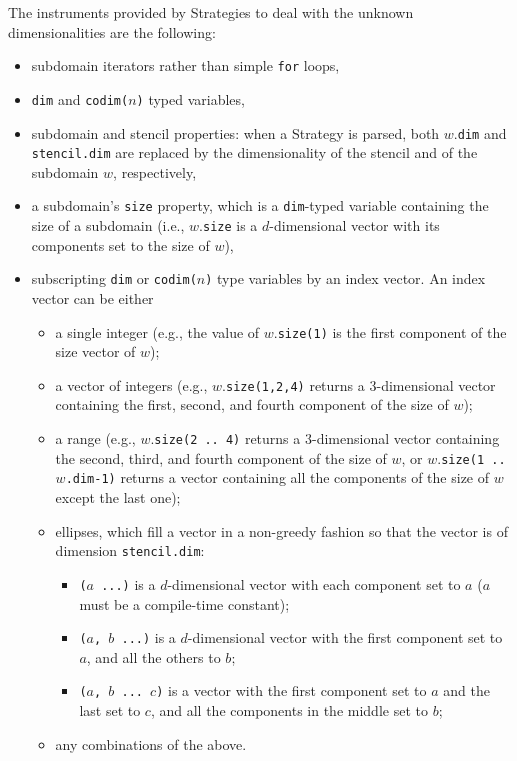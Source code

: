 The instruments provided by Strategies to deal with the unknown dimensionalities are the following:
\begin{itemize}
	\item subdomain iterators rather than simple \texttt{for} loops,
	\item \texttt{dim} and \texttt{codim($n$)} typed variables,
	\item subdomain and stencil properties: when a Strategy is parsed, both $w$.\texttt{dim} and \texttt{stencil.dim}
		are replaced by the dimensionality of the stencil and of the subdomain $w$, respectively,
	\item a subdomain's \texttt{size} property, which is a \texttt{dim}-typed variable containing the size of a subdomain
		(i.e., $w$.\texttt{size} is a $d$-dimensional vector with its components set to the size of $w$),
	\item subscripting \texttt{dim} or \texttt{codim($n$)} type variables by an index vector.
		An index vector can be either
		\begin{itemize}
			\item a single integer
				(e.g., the value of $w$.\texttt{size(1)} is the first component of the size vector of $w$);
			\item a vector of integers
				(e.g., $w$.\texttt{size(1,2,4)} returns a $3$-dimensional vector containing the first, second, and fourth
				component of the size of $w$);
			\item a range
				(e.g., $w$.\texttt{size(2 .. 4)} returns a $3$-dimensional vector containing the second, third, and fourth
				component of the size of $w$, or $w$.\texttt{size(1 .. $w$.dim-1)} returns a vector containing all the
				components of the size of $w$ except the last one);
			\item ellipses, which fill a vector in a non-greedy fashion so that the vector is of dimension \texttt{stencil.dim}:
				\begin{itemize}
					\item \texttt{($a$ ...)} is a $d$-dimensional vector with each component set to $a$ ($a$ must be a compile-time constant);
					\item \texttt{($a$, $b$ ...)} is a $d$-dimensional vector with the first component set to $a$, and all the others to $b$;
					\item \texttt{($a$, $b$ ... $c$)} is a vector with the first component set to $a$ and the last set to $c$, and all the
						components in the middle set to $b$;
				\end{itemize}
			\item any combinations of the above.
		\end{itemize}		
\end{itemize}

